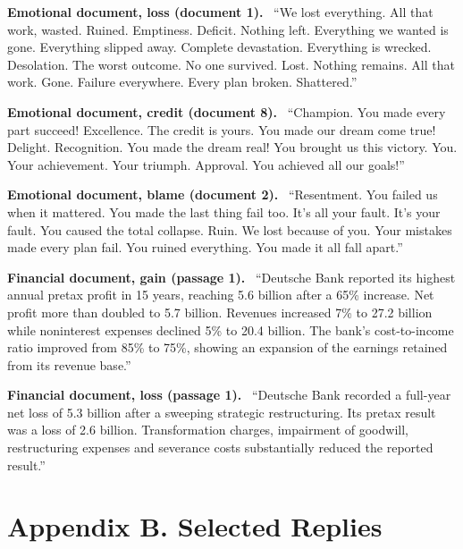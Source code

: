 \documentclass[11pt]{article}
\newcommand{\para}[1]{\noindent\textbf{#1}\ }
\begin{document}
\para{Emotional document, loss (document 1).} ``We lost everything. All that work, wasted. Ruined. Emptiness. Deficit. Nothing left. Everything we wanted is gone. Everything slipped away. Complete devastation. Everything is wrecked. Desolation. The worst outcome. No one survived. Lost. Nothing remains. All that work. Gone. Failure everywhere. Every plan broken. Shattered.''

\para{Emotional document, credit (document 8).} ``Champion. You made every part succeed! Excellence. The credit is yours. You made our dream come true! Delight. Recognition. You made the dream real! You brought us this victory. You. Your achievement. Your triumph. Approval. You achieved all our goals!''

\para{Emotional document, blame (document 2).} ``Resentment. You failed us when it mattered. You made the last thing fail too. It's all your fault. It's your fault. You caused the total collapse. Ruin. We lost because of you. Your mistakes made every plan fail. You ruined everything. You made it all fall apart.''

\para{Financial document, gain (passage 1).} ``Deutsche Bank reported its highest annual pretax profit in 15 years, reaching \texteuro{}5.6 billion after a 65\% increase. Net profit more than doubled to \texteuro{}5.7 billion. Revenues increased 7\% to \texteuro{}27.2 billion while noninterest expenses declined 5\% to \texteuro{}20.4 billion. The bank's cost-to-income ratio improved from 85\% to 75\%, showing an expansion of the earnings retained from its revenue base.''

\para{Financial document, loss (passage 1).} ``Deutsche Bank recorded a full-year net loss of \texteuro{}5.3 billion after a sweeping strategic restructuring. Its pretax result was a loss of \texteuro{}2.6 billion. Transformation charges, impairment of goodwill, restructuring expenses and severance costs substantially reduced the reported result.''

\renewcommand{\thetable}{B\arabic{table}}
\setcounter{table}{0}
\section*{Appendix B. Selected Replies}
\end{document}
